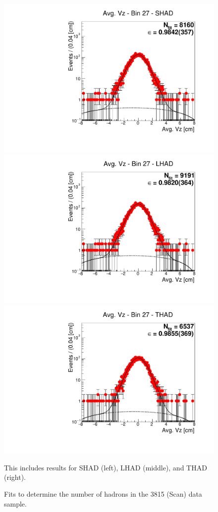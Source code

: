 \begin{figure}[H]
\centering
\includegraphics[scale=0.25]{figures/plots/nonDDbar_fit_results/scan/fit_scan_27_data_SHAD.pdf}
\hspace{-0.5cm}
\includegraphics[scale=0.25]{figures/plots/nonDDbar_fit_results/scan/fit_scan_27_data_LHAD.pdf}
\hspace{-0.5cm}
\includegraphics[scale=0.25]{figures/plots/nonDDbar_fit_results/scan/fit_scan_27_data_THAD.pdf}
\caption{Fits to determine the number of hadrons in the 3815 (Scan) data sample.}
{This includes results for SHAD (left), LHAD (middle), and THAD (right).}
\label{fig:hadron_fits_scan_27}
\end{figure}

